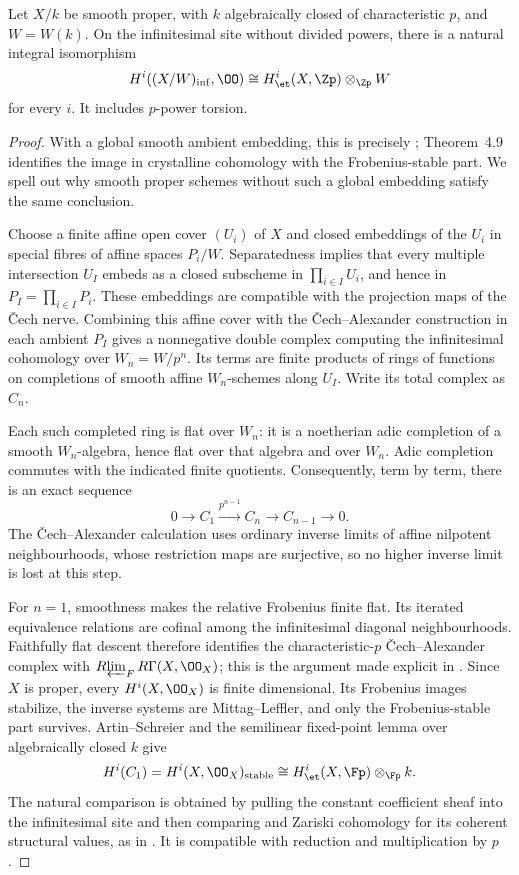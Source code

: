 \begin{theorem}\label{thm:DE-inf}
Let $X/k$ be smooth proper, with $k$ algebraically closed of characteristic $p$, and $W=W(k)$.  On the infinitesimal site without divided powers, there is a natural integral isomorphism
\[
 H^i((X/W)_{\mathrm{inf}},\OO)
   \cong H^i_{\et}(X,\Zp)\otimes_{\Zp}W
\]
for every $i$.  It includes $p$-power torsion.
\end{theorem}
\begin{proof}
With a global smooth ambient embedding, this is precisely \cite[Corollaries~4.7 and~4.11, Remark~4.10]{Ogus1975}; Theorem~4.9 identifies the image in crystalline cohomology with the Frobenius-stable part.  We spell out why smooth proper schemes without such a global embedding satisfy the same conclusion.

Choose a finite affine open cover $(U_i)$ of $X$ and closed embeddings of the $U_i$ in special fibres of affine spaces $P_i/W$.  Separatedness implies that every multiple intersection $U_I$ embeds as a closed subscheme in $\prod_{i\in I}U_i$, and hence in $P_I=\prod_{i\in I}P_i$.  These embeddings are compatible with the projection maps of the \v Cech nerve.  Combining this affine cover with the \v Cech--Alexander construction in each ambient $P_I$ gives a nonnegative double complex computing the infinitesimal cohomology over $W_n=W/p^n$.  Its terms are finite products of rings of functions on completions of smooth affine $W_n$-schemes along $U_I$.  Write its total complex as $C_n$.

Each such completed ring is flat over $W_n$: it is a noetherian adic completion of a smooth $W_n$-algebra, hence flat over that algebra and over $W_n$.  Adic completion commutes with the indicated finite quotients.  Consequently, term by term, there is an exact sequence
\[
 0\longrightarrow C_1\xrightarrow{p^{n-1}}C_n\longrightarrow C_{n-1}\longrightarrow0.\tag{E.3.1}
\]
The \v Cech--Alexander calculation uses ordinary inverse limits of affine nilpotent neighbourhoods, whose restriction maps are surjective, so no higher inverse limit is lost at this step.

For $n=1$, smoothness makes the relative Frobenius finite flat.  Its iterated equivalence relations are cofinal among the infinitesimal diagonal neighbourhoods.  Faithfully flat descent therefore identifies the characteristic-$p$ \v Cech--Alexander complex with $R\!\varprojlim_F R\Gamma(X,\OO_X)$; this is the argument made explicit in \cite[Remark~4.12]{Ogus1975}.  Since $X$ is proper, every $H^i(X,\OO_X)$ is finite dimensional.  Its Frobenius images stabilize, the inverse systems are Mittag--Leffler, and only the Frobenius-stable part survives.  Artin--Schreier and the semilinear fixed-point lemma over algebraically closed $k$ give
\[
 H^i(C_1)=H^i(X,\OO_X)_{\mathrm{stable}}
     \cong H^i_{\et}(X,\Fp)\otimes_{\Fp}k.
\]
The natural comparison is obtained by pulling the constant coefficient sheaf into the \etale infinitesimal site and then comparing \etale and Zariski cohomology for its coherent structural values, as in \cite[Propositions~1.8 and~1.13]{Ogus1975}.  It is compatible with reduction and multiplication by $p$.


\end{proof}
